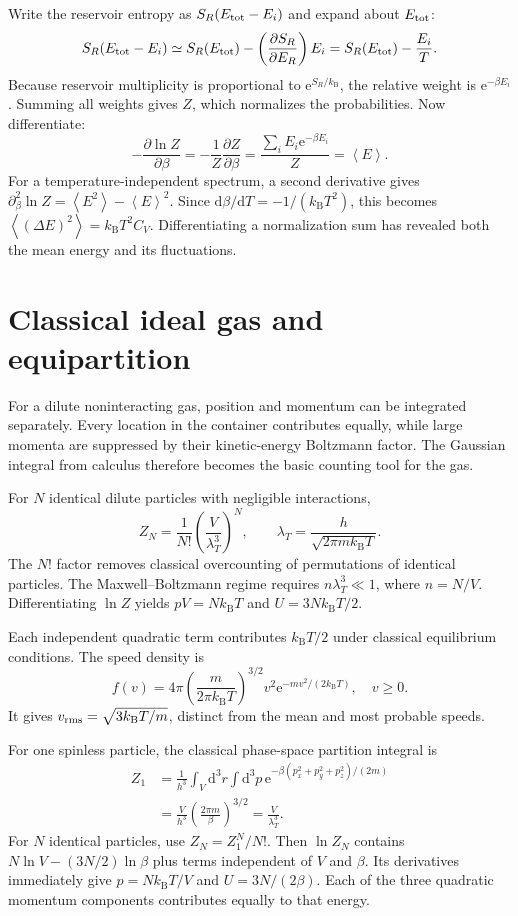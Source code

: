 \documentclass[11pt,oneside]{book}
\newcommand{\dd}{\mathrm{d}}
\newcommand{\ee}{\mathrm{e}}
\newcommand{\avg}[1]{\left\langle #1\right\rangle}
\newcommand{\pd}[2]{\frac{\partial #1}{\partial #2}}
\newcommand{\kb}{k_{\mathrm B}}
\theoremstyle{reviewstyle}
\begin{document}
Write the reservoir entropy as $S_R(E_{\rm tot}-E_i)$ and expand about $E_{\rm tot}$:
\begin{equation}
S_R(E_{\rm tot}-E_i)\simeq S_R(E_{\rm tot})-
\left(\pd{S_R}{E_R}\right)E_i
=S_R(E_{\rm tot})-\frac{E_i}{T}.
\end{equation}
Because reservoir multiplicity is proportional to $\ee^{S_R/\kb}$, the relative weight is $\ee^{-\beta E_i}$. Summing all weights gives $Z$, which normalizes the probabilities. Now differentiate:
\begin{equation}
-\pd{\ln Z}{\beta}=-\frac1Z\pd Z\beta
=\frac{\sum_iE_i\ee^{-\beta E_i}}Z=\avg E.
\end{equation}
For a temperature-independent spectrum, a second derivative gives $\partial_\beta^2\ln Z=\avg{E^2}-\avg E^2$. Since $\dd\beta/\dd T=-1/(\kb T^2)$, this becomes $\avg{(\Delta E)^2}=\kb T^2C_V$. Differentiating a normalization sum has revealed both the mean energy and its fluctuations.

\section{Classical ideal gas and equipartition}
For a dilute noninteracting gas, position and momentum can be integrated separately. Every location in the container contributes equally, while large momenta are suppressed by their kinetic-energy Boltzmann factor. The Gaussian integral from calculus therefore becomes the basic counting tool for the gas.

For $N$ identical dilute particles with negligible interactions,
\begin{equation}
Z_N=\frac1{N!}\left(\frac{V}{\lambda_T^3}\right)^N,\qquad
\lambda_T=\frac{h}{\sqrt{2\pi m\kb T}}.
\end{equation}
The $N!$ factor removes classical overcounting of permutations of identical particles. The Maxwell--Boltzmann regime requires $n\lambda_T^3\ll1$, where $n=N/V$. Differentiating $\ln Z$ yields $pV=N\kb T$ and $U=3N\kb T/2$.

Each independent quadratic term contributes $\kb T/2$ under classical equilibrium conditions. The speed density is
\begin{equation}
f(v)=4\pi\left(\frac{m}{2\pi\kb T}\right)^{3/2}v^2\ee^{-mv^2/(2\kb T)},\quad v\geq0.
\end{equation}
It gives $v_{\rm rms}=\sqrt{3\kb T/m}$, distinct from the mean and most probable speeds.

For one spinless particle, the classical phase-space partition integral is
\begin{align}
Z_1&=\frac1{h^3}\int_V\dd^3r\int\dd^3p\,
\ee^{-\beta(p_x^2+p_y^2+p_z^2)/(2m)}\\
&=\frac{V}{h^3}\left(\frac{2\pi m}{\beta}\right)^{3/2}
=\frac{V}{\lambda_T^3}.
\end{align}
For $N$ identical particles, use $Z_N=Z_1^N/N!$. Then $\ln Z_N$ contains $N\ln V-(3N/2)\ln\beta$ plus terms independent of $V$ and $\beta$. Its derivatives immediately give $p=N\kb T/V$ and $U=3N/(2\beta)$. Each of the three quadratic momentum components contributes equally to that energy.
\end{document}
